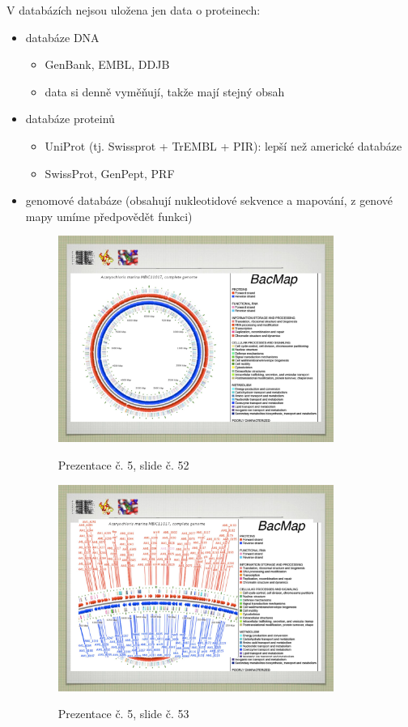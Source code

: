 \documentclass[DIV=8]{scrreprt}
\begin{document}
V databázích nejsou uložena jen data o proteinech:
\begin{itemize}[nosep]
    \item databáze DNA
\begin{itemize}[nosep]
    \item GenBank, EMBL, DDJB
    \item data si denně vyměňují, takže mají stejný obsah
\end{itemize}

    \item databáze proteinů
\begin{itemize}[nosep]
    \item UniProt (tj. Swissprot + TrEMBL + PIR): lepší než americké databáze
    \item SwissProt, GenPept, PRF
\end{itemize}

    \item genomové databáze (obsahují nukleotidové sekvence a mapování, z genové mapy umíme předpovědět funkci) \begin{figure}
    \caption{Prezentace č. 5, slide č. 52}
    \includegraphics[width=0.85\textwidth]{slides-5/slide-52.jpg}
    \centering
    \label{slides-5-slide-52}
\end{figure}
\begin{figure}
    \caption{Prezentace č. 5, slide č. 53}
    \includegraphics[width=0.85\textwidth]{slides-5/slide-53.jpg}
    \centering
    \label{slides-5-slide-53}
\end{figure}


\end{itemize}
\end{document}
